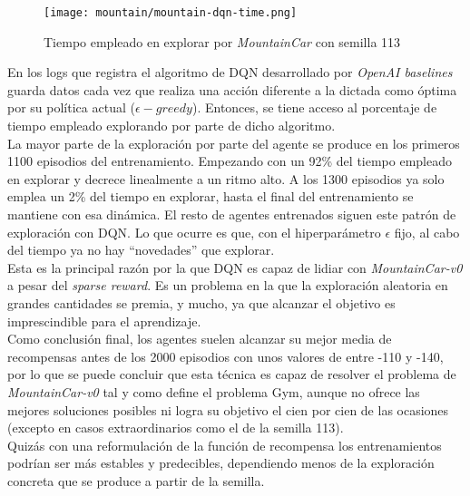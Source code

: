 \documentclass[11pt,fleqn]{book} %
\begin{document}
\begin{figure}[H]
	\centering\texttt{[image: mountain/mountain-dqn-time.png]}
	\caption{Tiempo empleado en explorar por \textit{MountainCar} con semilla 113}
	\label{fig:mountainDQNtime} %
\end{figure} 

En los logs que registra el algoritmo de DQN desarrollado por \textit{OpenAI baselines} guarda datos cada vez que realiza una acción diferente a la dictada como óptima por su política actual ($\epsilon-greedy$). Entonces, se tiene acceso al porcentaje de tiempo empleado explorando por parte de dicho algoritmo. \\

La mayor parte de la exploración por parte del agente se produce en los primeros 1100 episodios del entrenamiento. Empezando con un 92\% del tiempo empleado en explorar y decrece linealmente a un ritmo alto. A los 1300 episodios ya solo emplea un 2\% del tiempo en explorar, hasta el final del entrenamiento se mantiene con esa dinámica. El resto de agentes entrenados siguen este patrón de exploración con DQN. Lo que ocurre es que, con el hiperparámetro $\epsilon$ fijo, al cabo del tiempo ya no hay ``novedades'' que explorar. \\

Esta es la principal razón por la que DQN es capaz de lidiar con \textit{MountainCar-v0} a pesar del \textit{sparse reward}. Es un problema en la que la exploración aleatoria en grandes cantidades se premia, y mucho, ya que alcanzar el objetivo es imprescindible para el aprendizaje. \cite{article:sparse} \\

Como conclusión final, los agentes suelen alcanzar su mejor media de recompensas antes de los 2000 episodios con unos valores de entre -110 y -140, por lo que se puede concluir que esta técnica es capaz de resolver el problema de \textit{MountainCar-v0} tal y como define el problema Gym, aunque no ofrece las mejores soluciones posibles ni logra su objetivo el cien por cien de las ocasiones (excepto en casos extraordinarios como el de la semilla 113).\\

Quizás con una reformulación de la función de recompensa los entrenamientos podrían ser más estables y predecibles, dependiendo menos de la exploración concreta que se produce a partir de la semilla. \\
\end{document}

